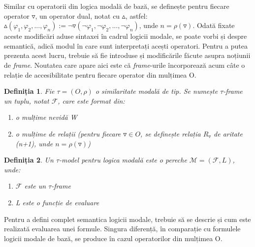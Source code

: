 \documentclass[12pt, openany]{book}
\newtheorem{definition}{Definiția}[chapter] %
\begin{document}
            \par{}
                Similar cu operatorii din logica modală de bază, se definește pentru fiecare operator 
                $\triangledown$, un operator dual, notat cu $\vartriangle$, astfel: $\vartriangle(\varphi_1, \varphi_2, ..., 
                \varphi_n) := \neg \triangledown(\neg \varphi_1, \neg \varphi_2, ..., \neg \varphi_n)$, unde $n=\rho(
                \triangledown)$. Odată fixate aceste modificări aduse sintaxei în cadrul logicii modale, se poate vorbi și 
                despre semantică, adică modul în care sunt interpretați acești operatori. Pentru a putea prezenta acest lucru, trebuie să 
                fie introduse și modificările făcute asupra noțiunii de \textit{frame}. Noutatea care apare aici este că 
                \textit{frame}-urile încorporează acum câte o relație de accesibilitate pentru fiecare operator din mulțimea O.

            \begin{definition}
                Fie $\tau=(O,\rho)$ o similaritate modală de tip. Se numește $\tau$-\textit{frame} un tuplu, notat 
                $\mathcal{F}$, care este format din:
                \begin{enumerate}
                    \item o mulțime nevidă W
                    \item o mulțime de relații (pentru fiecare $\triangledown \in O$, se definește relația 
                    $R_\triangledown$ de aritate (n+1), unde $n=\rho(\triangledown)$)
                \end{enumerate}
            \end{definition}

            \begin{definition}
                Un $\tau$-model pentru logica modală este o pereche $\mathcal{M} = (\mathcal{F}, L)$, unde:
                \begin{enumerate}
                    \item $\mathcal{F}$ este un $\tau$-\textit{frame}
                    \item L este o funcție de evaluare
                \end{enumerate}
            \end{definition}

            \par{}
                Pentru a defini complet semantica logicii modale, trebuie să se descrie și cum este realizată evaluarea unei
                formule. Singura diferență, în comparație cu formulele logicii modale de bază, se produce în cazul 
                operatorilor din mulțimea O.
\end{document}
